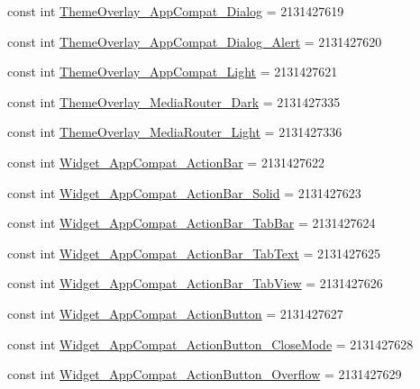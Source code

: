 \begin{CompactItemize}
\item 
const int \hyperlink{class__2doo_1_1_droid_1_1_resource_1_1_style_979c86023e94d03ec2f0550f6124fc8b}{ThemeOverlay\_\-AppCompat\_\-Dialog} = 2131427619
\item 
const int \hyperlink{class__2doo_1_1_droid_1_1_resource_1_1_style_4a50372dc4ce61a5e4c0d6c9c9db7b04}{ThemeOverlay\_\-AppCompat\_\-Dialog\_\-Alert} = 2131427620
\item 
const int \hyperlink{class__2doo_1_1_droid_1_1_resource_1_1_style_2adbb8817870272ccccc47a652f91ddc}{ThemeOverlay\_\-AppCompat\_\-Light} = 2131427621
\item 
const int \hyperlink{class__2doo_1_1_droid_1_1_resource_1_1_style_796aef682cee1398e4b095741d710df2}{ThemeOverlay\_\-MediaRouter\_\-Dark} = 2131427335
\item 
const int \hyperlink{class__2doo_1_1_droid_1_1_resource_1_1_style_26fd2e84dab622531912aa63ddb56897}{ThemeOverlay\_\-MediaRouter\_\-Light} = 2131427336
\item 
const int \hyperlink{class__2doo_1_1_droid_1_1_resource_1_1_style_034f8f4862fd32cbe390b5f4a4d6b5cc}{Widget\_\-AppCompat\_\-ActionBar} = 2131427622
\item 
const int \hyperlink{class__2doo_1_1_droid_1_1_resource_1_1_style_f4d7977d9ea041708257781ffa9cd7a2}{Widget\_\-AppCompat\_\-ActionBar\_\-Solid} = 2131427623
\item 
const int \hyperlink{class__2doo_1_1_droid_1_1_resource_1_1_style_c55af9f2f1bcb382e4d9f725b4d1211a}{Widget\_\-AppCompat\_\-ActionBar\_\-TabBar} = 2131427624
\item 
const int \hyperlink{class__2doo_1_1_droid_1_1_resource_1_1_style_f42acb7b3df43b2fd8897512ce2efb07}{Widget\_\-AppCompat\_\-ActionBar\_\-TabText} = 2131427625
\item 
const int \hyperlink{class__2doo_1_1_droid_1_1_resource_1_1_style_928f5272219380a7a5de179b4370d3f9}{Widget\_\-AppCompat\_\-ActionBar\_\-TabView} = 2131427626
\item 
const int \hyperlink{class__2doo_1_1_droid_1_1_resource_1_1_style_b586e4d74aaf9e5a2d1dd6f558664670}{Widget\_\-AppCompat\_\-ActionButton} = 2131427627
\item 
const int \hyperlink{class__2doo_1_1_droid_1_1_resource_1_1_style_958ce28e52a393d4931d302b1e31bf4c}{Widget\_\-AppCompat\_\-ActionButton\_\-CloseMode} = 2131427628
\item 
const int \hyperlink{class__2doo_1_1_droid_1_1_resource_1_1_style_744c63678410a5530ca86cc40f4bbd98}{Widget\_\-AppCompat\_\-ActionButton\_\-Overflow} = 2131427629

\end{CompactItemize}

